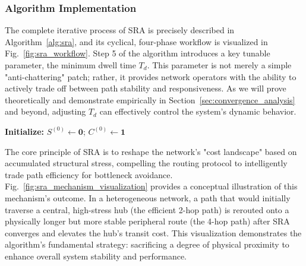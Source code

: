 \documentclass[journal]{IEEEtran}
\begin{document}
\subsubsection{Algorithm Implementation}
The complete iterative process of SRA is precisely described in Algorithm~\ref{alg:sra}, and its cyclical, four-phase workflow is visualized in Fig.~\ref{fig:sra_workflow}. Step 5 of the algorithm introduces a key tunable parameter, the minimum dwell time $T_d$. This parameter is not merely a simple "anti-chattering" patch; rather, it provides network operators with the ability to actively trade off between path stability and responsiveness. As we will prove theoretically and demonstrate empirically in Section~\ref{sec:convergence_analysis} and beyond, adjusting $T_d$ can effectively control the system's dynamic behavior.


\begin{algorithm}[h!]
    \DontPrintSemicolon
    \BlankLine
    \textbf{Initialize:} $S^{(0)} \leftarrow \mathbf{0}$; $C^{(0)} \leftarrow \mathbf{1}$\;
    \BlankLine
    \caption{System Relaxation Algorithm (SRA)}
    \label{alg:sra}
\end{algorithm}

The core principle of SRA is to reshape the network's "cost landscape" based on accumulated structural stress, compelling the routing protocol to intelligently trade path efficiency for bottleneck avoidance. Fig.~\ref{fig:sra_mechanism_visualization} provides a conceptual illustration of this mechanism's outcome. In a heterogeneous network, a path that would initially traverse a central, high-stress hub (the efficient 2-hop path) is rerouted onto a physically longer but more stable peripheral route (the 4-hop path) after SRA converges and elevates the hub's transit cost. This visualization demonstrates the algorithm's fundamental strategy: sacrificing a degree of physical proximity to enhance overall system stability and performance.
\end{document}
